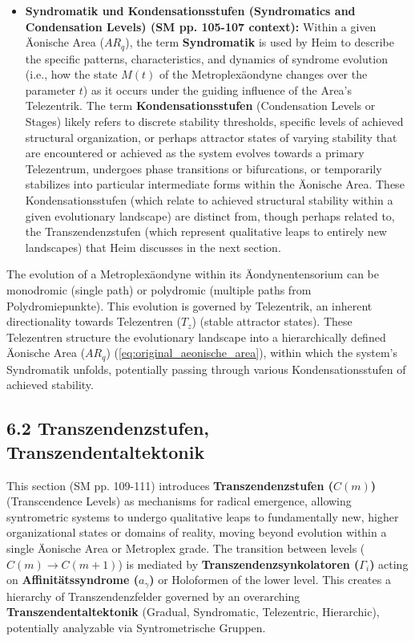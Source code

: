 \documentclass[12pt]{article}
\newcommand{\conceptualsyndrome}{a}
\newcommand{\telezentrum}{T_z}
\newcommand{\aeonischearea}{AR_q}
\newcommand{\transzendenzstufe}[1]{C(#1)}
\newcommand{\transzendenzsynkolator}{\Gamma_i}
\begin{document}
\begin{itemize}
    \item \textbf{Syndromatik und Kondensationsstufen (Syndromatics and Condensation Levels) (SM pp. 105-107 context):}
    Within a given Äonische Area (\(\aeonischearea\)), the term \textbf{Syndromatik} is used by Heim to describe the specific patterns, characteristics, and dynamics of syndrome evolution (i.e., how the state \( M(t) \) of the Metroplexäondyne changes over the parameter \(t\)) as it occurs under the guiding influence of the Area's Telezentrik. The term \textbf{Kondensationsstufen} (Condensation Levels or Stages) likely refers to discrete stability thresholds, specific levels of achieved structural organization, or perhaps attractor states of varying stability that are encountered or achieved as the system evolves towards a primary Telezentrum, undergoes phase transitions or bifurcations, or temporarily stabilizes into particular intermediate forms within the Äonische Area. These Kondensationsstufen (which relate to achieved structural stability within a given evolutionary landscape) are distinct from, though perhaps related to, the Transzendenzstufen (which represent qualitative leaps to entirely new landscapes) that Heim discusses in the next section.
\end{itemize}

The evolution of a Metroplexäondyne within its Äondynentensorium can be monodromic (single path) or polydromic (multiple paths from Polydromiepunkte). This evolution is governed by Telezentrik, an inherent directionality towards Telezentren (\(\telezentrum\)) (stable attractor states). These Telezentren structure the evolutionary landscape into a hierarchically defined Äonische Area (\(\aeonischearea\)) (\eqref{eq:original_aeonische_area}), within which the system's Syndromatik unfolds, potentially passing through various Kondensationsstufen of achieved stability.

\subsection{6.2 Transzendenzstufen, Transzendentaltektonik}
\label{sec:transzendenz}

This section (SM pp. 109-111) introduces \textbf{Transzendenzstufen (\(\transzendenzstufe{m}\))} (Transcendence Levels) as mechanisms for radical emergence, allowing syntrometric systems to undergo qualitative leaps to fundamentally new, higher organizational states or domains of reality, moving beyond evolution within a single Äonische Area or Metroplex grade. The transition between levels (\(\transzendenzstufe{m} \to \transzendenzstufe{m+1}\)) is mediated by \textbf{Transzendenzsynkolatoren (\(\transzendenzsynkolator\))} acting on \textbf{Affinitätssyndrome (\(\conceptualsyndrome_\gamma\))} or Holoformen of the lower level. This creates a hierarchy of Transzendenzfelder governed by an overarching \textbf{Transzendentaltektonik} (Gradual, Syndromatic, Telezentric, Hierarchic), potentially analyzable via Syntrometrische Gruppen.
\end{document}
